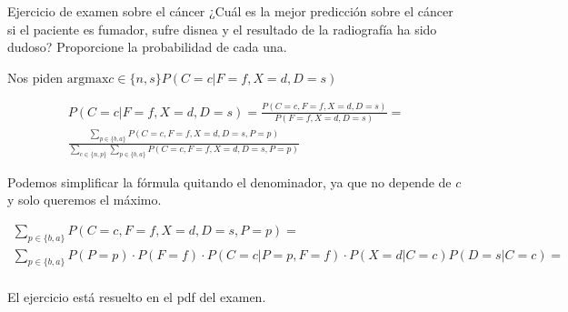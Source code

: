\begin{exercisebox}{Ejercicio de examen sobre el cáncer}
    ¿Cuál es la mejor predicción sobre el cáncer si el paciente es fumador,
    sufre disnea y el resultado de la radiografía ha sido dudoso? Proporcione
    la probabilidad de cada una.
\end{exercisebox}

Nos piden $\text{argmax} c \in \{n, s\} P(C = c | F = f, X = d, D = s)$

\begin{align*}
    P(C = c | F = f, X = d, D = s) = \frac{P(C = c, F = f, X = d, D = s)}{P(F = f, X = d, D = s)} = \\[1em]
    \frac{\sum_{p \in \{b, a\}} P(C = c, F = f, X = d, D = s, P = p)}{\sum_{c \in \{n, p\}} \sum_{p \in \{b, a\}} P(C = c, F = f, X = d, D = s, P = p)}
\end{align*}

Podemos simplificar la fórmula quitando el denominador, ya que no
depende de $c$ y solo queremos el máximo.

\begin{align*}
    \sum_{p \in \{b, a\}} P(C = c, F = f, X = d, D = s, P = p) = \\[1em]
    \sum_{p \in \{b, a\}} P(P = p) \cdot P(F = f) \cdot P(C = c | P = p, F = f) \cdot P(X = d | C = c) P(D = s | C = c) = \\[1em]
\end{align*}

El ejercicio está resuelto en el pdf del examen.
